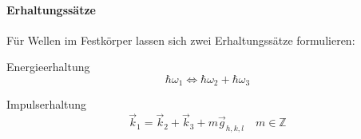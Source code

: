 	\paragraph{Erhaltungssätze}
	Für Wellen im Festkörper lassen sich zwei Erhaltungssätze formulieren:
	\begin{important}
		Energieerhaltung
		\begin{equation}
			\label{eq:II.5.23}
			\hbar \omega_1 \iff \hbar \omega_2 + \hbar \omega_3
		\end{equation}
	\end{important}
	\begin{important}
		Impulserhaltung
		\begin{equation}
			\label{eq:II.5.24}
			\Vec{k}_{1} = \Vec{k}_{2} + \Vec{k}_{3} + m \Vec{g}_{h,k,l} \quad m  \in \mathbb{Z}
		\end{equation}
	\end{important}

